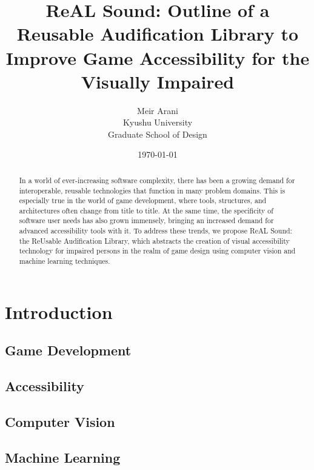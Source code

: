 \documentclass{report}
\begin{document}

\author{Meir Arani \\ Kyushu University \\ Graduate School of Design} %
\title{ReAL Sound: Outline of a Reusable Audification Library to Improve Game Accessibility for the Visually Impaired} 
\date{\today{}} 
\maketitle{} 


\begin{abstract}
    In a world of ever-increasing software complexity, there has been a growing demand for interoperable, reusable technologies that function in many problem domains. This is especially true in the world of game development, where tools, structures, and architectures often change from title to title. At the same time, the specificity of software user needs has also grown immensely, bringing an increased demand for advanced accessibility tools with it. To address these trends, we propose ReAL Sound: the ReUsable Audification Library, which abstracts the creation of visual accessibility technology for impaired persons in the realm of game design using computer vision and machine learning techniques.  
\end{abstract}

\newpage{} %


\tableofcontents{} %
\newpage{} %



\chapter{Introduction}
\section{Game Development}
\section{Accessibility}
\section{Computer Vision}
\section{Machine Learning}
\end{document}
